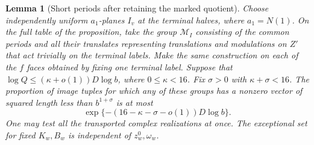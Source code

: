 \documentclass[a4paper,11pt]{article}
\newtheorem{lemma}[proposition]{Lemma}
\theoremstyle{definition}
\theoremstyle{remark}
\numberwithin{equation}{section}
\begin{document}
\begin{lemma}[Short periods after retaining the marked quotient]
\label{lem:markedshort394}
Choose independently uniform \(a_1\)-planes \(I_v\) at the
terminal halves, where \(a_1=N(1)\). On the full table of
the proposition, take the group \(\mathcal M_I\) consisting
of the common periods and all their translates representing
translations and modulations on \(Z'\) that act trivially on
the terminal labels. Make the same construction on each of
the \(f\) faces obtained by fixing one terminal label.
Suppose that \(\log Q\le(\kappa+o(1))D\log b\), where
\(0\le\kappa<16\). Fix \(\sigma>0\) with \(\kappa+\sigma<16\).
The proportion of image tuples for which any of these groups
has a nonzero vector of squared length less than \(b^{1+\sigma}\)
is at most
\[
             \exp\{-(16-\kappa-\sigma-o(1))D\log b\}.
\]
One may test all the transported complex realizations at once.
The exceptional set for fixed \(K_w,B_w\) is independent of
\(z_w^0,\omega_w\).
\end{lemma}
\end{document}
